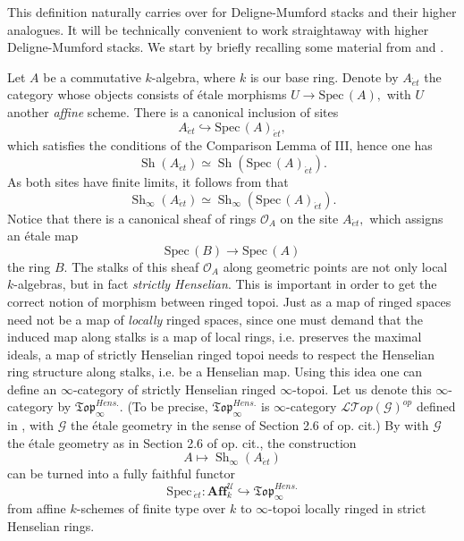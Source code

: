 \documentclass[12pt]{amsart}
\theoremstyle{definition}
\newcommand{\cG}{\mathcal{G}}
\newcommand{\cU}{\mathcal{U}}
\newcommand{\Affku}{\mathbf{Aff}^{\cU}_{k}}
\newcommand{\Topi}{\mathfrak{Top}_\i}
\newcommand{\Spec}{\mathrm{Spec}\,}
\newcommand{\Sh}{\operatorname{Sh}}
\newcommand{\et}{\acute{e}t}
\renewcommand{\i}{\infty}
\def\Shi{\Sh_\i}
\def\Htop{\Topi^{\mathit{Hens.}}}
\begin{document}
This definition naturally carries over for Deligne-Mumford stacks and their higher analogues. It will be technically convenient to work straightaway with higher Deligne-Mumford stacks. We start by briefly recalling some material from \cite{dagv} and \cite{higherdave}.





Let $A$ be a commutative $k$-algebra, where $k$ is our base ring. Denote by $A_{\et}$ the category whose objects consists of \'etale morphisms $U \to \Spec\left(A\right),$ with $U$ another \emph{affine} scheme. There is a canonical inclusion of sites $$A_{\et} \hookrightarrow \Spec\left(A\right)_{\et},$$ which satisfies the conditions of the Comparison Lemma of \cite{SGA4} III, hence one has $$\Sh\left(A_{\et}\right)\simeq \Sh\left(\Spec\left(A\right)_{\et}\right).$$ As both sites have finite limits, it follows from \cite[Proposition 6.4.5.4]{htt} that $$\Shi\left(A_{\et}\right) \simeq \Shi\left(\Spec\left(A\right)_{\et}\right).$$ Notice that there is a canonical sheaf of rings $\mathcal{O}_A$ on the site $A_{\et},$ which assigns an \'etale map $$\Spec\left(B\right) \to \Spec\left(A\right)$$ the ring $B.$ The stalks of this sheaf $\mathcal{O}_{A}$ along geometric points are not only local $k$-algebras, but in fact \emph{strictly Henselian}. This is important in order to get the correct notion of morphism between ringed topoi. Just as a map of ringed spaces need not be a map of \emph{locally} ringed spaces, since one must demand that the induced map along stalks is a map of local rings, i.e. preserves the maximal ideals, a map of strictly Henselian ringed topoi needs to respect the Henselian ring structure along stalks, i.e. be a Henselian map. Using this idea one can define an $\i$-category of strictly Henselian ringed $\i$-topoi. Let us denote this $\i$-category by $\Htop$. (To be precise, $\Htop$ is $\i$-category ${\mathcal L}{\mathcal T}op\left(\cG\right)^{op}$ defined in \cite[Definition 1.4.8]{dagv}, with $\cG$ the \'etale geometry in the sense of Section 2.6 of op. cit.) By \cite[Theorem 2.2.12]{dagv} with $\mathcal{G}$ the \'etale geometry as in Section 2.6 of op. cit., the construction $$A \mapsto \Shi\left(A_{\et}\right)$$ can be turned into a fully faithful functor
$$\Spec_{\et}:\Affku \hookrightarrow \Htop$$ from affine $k$-schemes of finite type over $k$ to $\i$-topoi locally ringed in strict Henselian rings.
\end{document}
